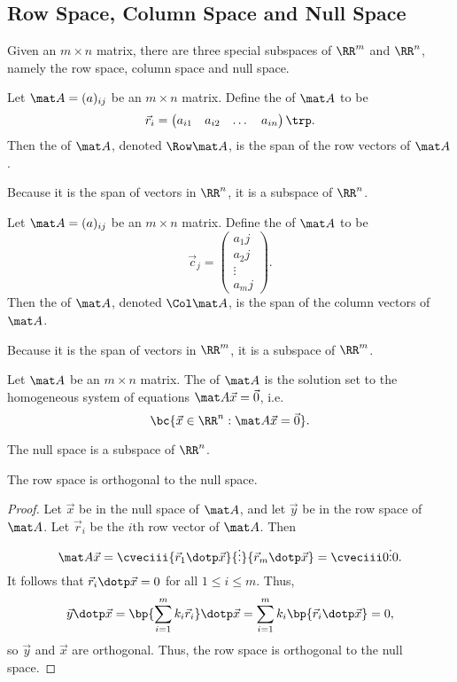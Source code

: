 \subsection{Row Space, Column Space and Null Space}

Given an $m \times n$ matrix, there are three special subspaces of $\RR^m$ and $\RR^n$, namely the row space, column space and null space.

\begin{definition}
    Let $\mat A = (a)_{ij}$ be an $m \times n$ matrix. Define the  of $\mat A$ to be \[\vec r_i = \begin{pmatrix}a_{i1} & a_{i2} & \dots & a_{in}\end{pmatrix}\trp.\] Then the  of $\mat A$, denoted $\Row \mat A$, is the span of the row vectors of $\mat A$.
\end{definition}

Because it is the span of vectors in $\RR^n$, it is a subspace of $\RR^n$.

\begin{definition}
    Let $\mat A = (a)_{ij}$ be an $m \times n$ matrix. Define the  of $\mat A$ to be \[\vec c_j = \begin{pmatrix}a_1j \\ a_2j \\ \vdots \\ a_mj \end{pmatrix}.\] Then the  of $\mat A$, denoted $\Col \mat A$, is the span of the column vectors of $\mat A$.
\end{definition}

Because it is the span of vectors in $\RR^m$, it is a subspace of $\RR^m$.

\begin{definition}
    Let $\mat A$ be an $m \times n$ matrix. The  of $\mat A$ is the solution set to the homogeneous system of equations $\mat A \vec x = \vec 0$, i.e. \[\bc{\vec x \in \RR^n : \mat A \vec x = \vec 0}.\]
\end{definition}

The null space is a subspace of $\RR^n$.

\begin{proposition}
    The row space is orthogonal to the null space.
\end{proposition}
\begin{proof}
    Let $\vec x$ be in the null space of $\mat A$, and let $\vec y$ be in the row space of $\mat A$. Let $\vec r_i$ be the $i$th row vector of $\mat A$. Then \[\mat A \vec x = \cveciii{\vec r_1 \dotp \vec x}{\vdots}{\vec r_m \dotp \vec x} = \cveciii0{\vdots}0.\] It follows that $\vec r_i \dotp \vec x = 0$ for all $1 \leq i \leq m$. Thus, \[\vec y \dotp \vec x = \bp{\sum_{i = 1}^m k_i \vec r_i} \dotp \vec x = \sum_{i = 1}^m k_i \bp{\vec r_i \dotp \vec x} = 0,\] so $\vec y$ and $\vec x$ are orthogonal. Thus, the row space is orthogonal to the null space.
\end{proof}

